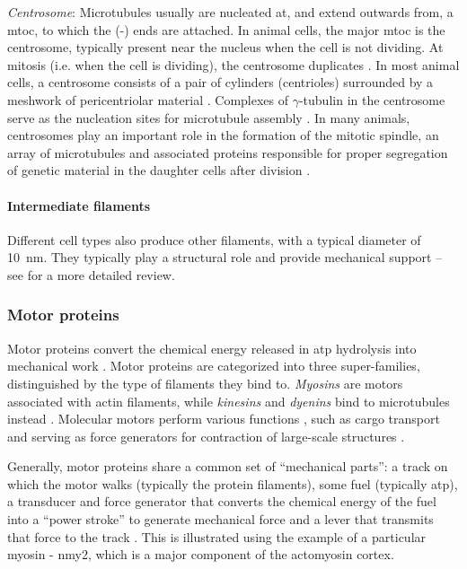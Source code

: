\textit{Centrosome}: Microtubules usually are nucleated at, and extend outwards from, a \ac{mtoc}, to which the (-) ends are attached. In animal cells, the major \ac{mtoc} is the centrosome, typically present near the nucleus when the cell is not dividing. At mitosis (i.e. when the cell is dividing), the centrosome duplicates \citep{chaffey2003alberts}. In most animal cells, a centrosome consists of a pair of cylinders (centrioles) surrounded by a meshwork of pericentriolar material \citep{pimenta2020pericentriolar}. Complexes of $\gamma$-tubulin in the centrosome serve as the nucleation sites for microtubule assembly \citep{kellogg1994centrosome}. In many animals, centrosomes play an important role in the formation of the mitotic spindle, an array of microtubules and associated proteins responsible for proper segregation of genetic material in the daughter cells after division \citep{bettencourt2013q,chaffey2003alberts}.

\paragraph{Intermediate filaments}
Different cell types also produce other filaments, with a typical diameter of \SI{10}{\nano\meter}. They typically play a structural role and provide mechanical support -- see \cite{chaffey2003alberts,herrmann2007intermediate} for a more detailed review.

\subsubsection{Motor proteins}\label{subsubsec:MotorCytoskeleton}
Motor proteins convert the chemical energy released in \ac{atp} hydrolysis into mechanical work \citep{chaffey2003alberts,bray2001cell,kolomeisky2007molecular,howard2002mechanics}. Motor proteins are categorized into three super-families, distinguished by the type of filaments they bind to. \textit{Myosins} are motors associated with actin filaments, while \textit{kinesins} and \textit{dyenins} bind to microtubules instead \citep{chaffey2003alberts}. Molecular motors perform various functions \citep{chaffey2003alberts}, such as cargo transport \citep{vale2003molecular} and serving as force generators for contraction of large-scale structures \citep{howard2002mechanics,carlsson2006contractile}.

Generally, motor proteins share a common set of \enquote{mechanical parts}: a track on which the motor walks (typically the protein filaments), some fuel (typically \ac{atp}), a transducer and force generator that converts the chemical energy of the fuel into a \enquote{power stroke} to generate mechanical force and a lever that transmits that force to the track \citep{hwang2009mechanical}. This is illustrated using the example of a particular myosin - \acs{nmy2}, which is a major component of the actomyosin cortex. 

